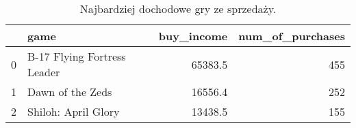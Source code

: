 \begin{table}[h]
\centering
\caption{Najbardziej dochodowe gry ze sprzedaży.}\label{tab:purchases}
\begin{tabular}{rlrr}
\hline
    & game                        &   buy\_income &   num\_of\_purchases \\
\hline
  0 & B-17 Flying Fortress Leader &      65383.5 &                455 \\
  1 & Dawn of the Zeds            &      16556.4 &                252 \\
  2 & Shiloh: April Glory         &      13438.5 &                155 \\
\hline
\end{tabular}\end{table}